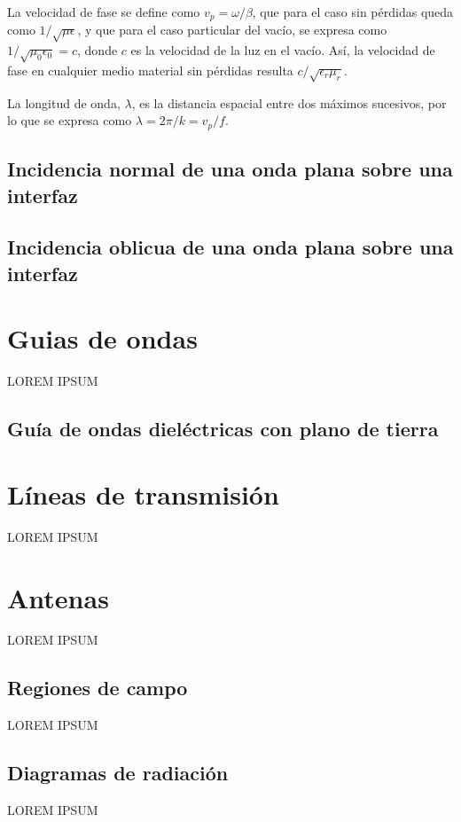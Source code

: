 La velocidad de fase se define como $v_p=\omega/\beta$, que para el caso sin pérdidas queda como $1/\sqrt{\mu \epsilon}$, y que para el caso particular del vacío, se expresa como $1/\sqrt{\mu_0 \epsilon_0} = c$, donde $c$ es la velocidad de la luz en el vacío. Así, la velocidad de fase en cualquier medio material sin pérdidas resulta $c/\sqrt{\epsilon_r \mu_r}$.

La longitud de onda, $\lambda$, es la distancia espacial entre dos máximos sucesivos, por lo que se expresa como $\lambda = 2\pi / k = v_p/f$.

\subsection{Incidencia normal de una onda plana sobre una interfaz}


\subsection{Incidencia oblicua de una onda plana sobre una interfaz}

\section{Guias de ondas}
\label{subsec_guias_de_ondas}
LOREM IPSUM

\subsection{Guía de ondas dieléctricas con plano de tierra}




\section{Líneas de transmisión}
\label{subsec_lineas_de_transmision}
LOREM IPSUM
\section{Antenas}
\label{subsec_antenas}
LOREM IPSUM
\subsection{Regiones de campo}
\label{subsubsec_regiones_de_campo}
LOREM IPSUM
\subsection{Diagramas de radiación}
\label{subsubsec_diag_de_rad}
LOREM IPSUM
